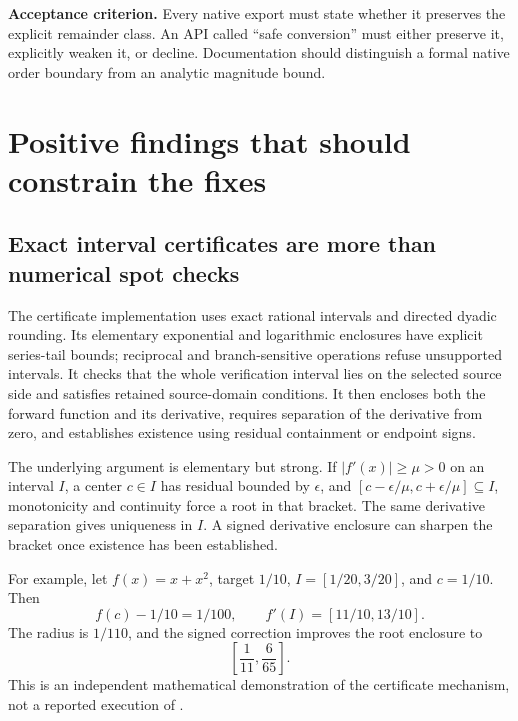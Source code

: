 \documentclass[11pt,a4paper]{article}
\newcommand{\code}[1]{\texttt{\detokenize{#1}}}
\begin{document}
\textbf{Acceptance criterion.} Every native export must state whether it preserves the explicit remainder class. An API called ``safe conversion'' must either preserve it, explicitly weaken it, or decline. Documentation should distinguish a formal native order boundary from an analytic magnitude bound.

\section{Positive findings that should constrain the fixes}\label{sec:positive}

\subsection{Exact interval certificates are more than numerical spot checks}

The certificate implementation uses exact rational intervals and directed dyadic rounding. Its elementary exponential and logarithmic enclosures have explicit series-tail bounds; reciprocal and branch-sensitive operations refuse unsupported intervals. It checks that the whole verification interval lies on the selected source side and satisfies retained source-domain conditions. It then encloses both the forward function and its derivative, requires separation of the derivative from zero, and establishes existence using residual containment or endpoint signs.\cite{cert}

The underlying argument is elementary but strong. If $|f'(x)|\ge\mu>0$ on an interval $I$, a center $c\in I$ has residual bounded by $\epsilon$, and $[c-\epsilon/\mu,c+\epsilon/\mu]\subseteq I$, monotonicity and continuity force a root in that bracket. The same derivative separation gives uniqueness in $I$. A signed derivative enclosure can sharpen the bracket once existence has been established.

For example, let $f(x)=x+x^2$, target $1/10$, $I=[1/20,3/20]$, and $c=1/10$. Then
\begin{equation}
 f(c)-1/10=1/100,\qquad f'(I)=[11/10,13/10].
\end{equation}
The radius is $1/110$, and the signed correction improves the root enclosure to
\begin{equation}
 \left[\frac1{11},\frac6{65}\right].
\end{equation}
This is an independent mathematical demonstration of the certificate mechanism, not a reported execution of \code{InverseCertificate}.
\end{document}
